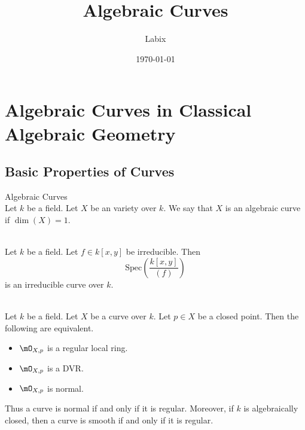 \documentclass[a4paper]{article}
\title{Algebraic Curves}
\author{Labix}
\date{\today}
\begin{document}
\maketitle
\begin{abstract}
\end{abstract}
\pagebreak
\tableofcontents
\pagebreak

\section{Algebraic Curves in Classical Algebraic Geometry}
\subsection{Basic Properties of Curves}
\begin{defn}{Algebraic Curves}{}\\
Let $k$ be a field. Let $X$ be an variety over $k$. We say that $X$ is an algebraic curve if $\dim(X)=1$. 
\end{defn}

\begin{eg}{}{}\\
Let $k$ be a field. Let $f\in k[x,y]$ be irreducible. Then $$\text{Spec}\left(\frac{k[x,y]}{(f)}\right)$$ is an irreducible curve over $k$. 
\end{eg}

\begin{prp}{}{}\\
Let $k$ be a field. Let $X$ be a curve over $k$. Let $p\in X$ be a closed point. Then the following are equivalent. 
\begin{itemize}
\item $\mO_{X,p}$ is a regular local ring. 
\item $\mO_{X,p}$ is a DVR. 
\item $\mO_{X,p}$ is normal. 
\end{itemize}
\end{prp}

Thus a curve is normal if and only if it is regular. Moreover, if $k$ is algebraically closed, then a curve is smooth if and only if it is regular. 
\end{document}
